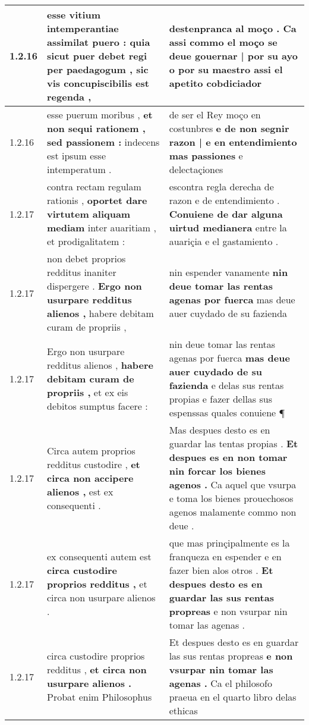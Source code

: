 \begin{tabular}{|p{1cm}|p{6.5cm}|p{6.5cm}|}
1.2.16 & esse vitium intemperantiae assimilat puero : \textbf{ quia sicut puer debet regi per paedagogum , } sic vis concupiscibilis est regenda , & destenpranca al moço . \textbf{ Ca assi commo el moço se deue gouernar | por su ayo o por su maestro } assi el apetito cobdiciador \\\hline
1.2.16 & esse puerum moribus , \textbf{ et non sequi rationem , sed passionem : } indecens est ipsum esse intemperatum . & de ser el Rey moço en costunbres \textbf{ e de non segnir razon | e en entendimiento mas passiones } e delectaçiones \\\hline
1.2.17 & contra rectam regulam rationis , \textbf{ oportet dare virtutem aliquam mediam } inter auaritiam , et prodigalitatem : & escontra regla derecha de razon e de entendimiento . \textbf{ Conuiene de dar alguna uirtud medianera } entre la auariçia e el gastamiento . \\\hline
1.2.17 & non debet proprios redditus inaniter dispergere . \textbf{ Ergo non usurpare redditus alienos , } habere debitam curam de propriis , & nin espender vanamente \textbf{ nin deue tomar las rentas agenas por fuerca } mas deue auer cuydado de su fazienda \\\hline
1.2.17 & Ergo non usurpare redditus alienos , \textbf{ habere debitam curam de propriis , } et ex eis debitos sumptus facere : & nin deue tomar las rentas agenas por fuerca \textbf{ mas deue auer cuydado de su fazienda } e delas sus rentas propias e fazer dellas sus espenssas quales conuiene ¶ \\\hline
1.2.17 & Circa autem proprios redditus custodire , \textbf{ et circa non accipere alienos , } est ex consequenti . & Mas despues desto es en guardar las tentas propias . \textbf{ Et despues es en non tomar nin forcar los bienes agenos . } Ca aquel que vsurpa e toma los bienes prouechosos agenos malamente commo non deue . \\\hline
1.2.17 & ex consequenti autem est \textbf{ circa custodire proprios redditus , } et circa non usurpare alienos . & que mas prinçipalmente es la franqueza en espender e en fazer bien alos otros . \textbf{ Et despues desto es en guardar las sus rentas propreas } e non vsurpar nin tomar las agenas . \\\hline
1.2.17 & circa custodire proprios redditus , \textbf{ et circa non usurpare alienos . } Probat enim Philosophus & Et despues desto es en guardar las sus rentas propreas \textbf{ e non vsurpar nin tomar las agenas . } Ca el philosofo praeua en el quarto libro delas ethicas \\\hline

\end{tabular}
